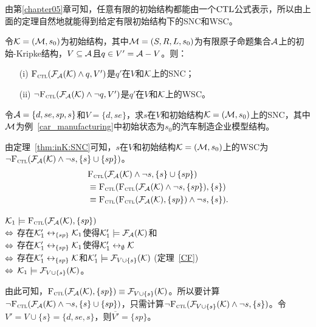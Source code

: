 由第\ref{chapter05}章可知，任意有限的初始结构都能由一个$\textrm{CTL}$公式表示，所以由上面的定理自然地就能得到给定有限初始结构下的SNC和WSC。
\begin{corollary}\label{thm:inK:SNC}
	令${\cal K}= ({\cal M}, s_0)$为初始结构，其中${\cal M}=(S,R,L,s_0)$为有限原子命题集合${\cal A}$上的初始-Kripke结构，$V \subseteq {\cal A}$且$q\in V' = {\cal A} - V$。则：
	\begin{itemize}
		\item[(i)] ${\textsc{F}_{\textsc{ctl}}}({\cal F}_{{\cal A}}({\cal K}) \wedge q, V')$是$q'$在$V$和${\cal K}$上的SNC；
		\item[(ii)] $\neg {\textsc{F}_{\textsc{ctl}}}({\cal F}_{{\cal A}}({\cal K}) \wedge \neg q, V')$是$q'$在$V$和${\cal K}$上的WSC。
	\end{itemize}
\end{corollary}

\begin{example}
令${\cal A}=\{d,se,sp,s\}$和$V=\{d,se\}$，求$s$在$V$和初始结构${\cal K} = ({\cal M},s_0)$上的SNC，其中${\cal M}$为例~\ref{car_manufacturing}中初始状态为$s_0$的汽车制造企业模型结构。

由定理~\ref{thm:inK:SNC}可知，$s$在$V$和初始结构${\cal K} = ({\cal M},s_0)$上的WSC为$\neg {\textsc{F}_{\textsc{ctl}}}({\cal F}_{{\cal A}}({\cal K}) \wedge \neg s, \{s\} \cup \{sp\})$。
\begin{align*}
&	{\textsc{F}_{\textsc{ctl}}}({\cal F}_{{\cal A}}({\cal K}) \wedge \neg s, \{s\} \cup \{sp\})\\
&	\equiv {\textsc{F}_{\textsc{ctl}}}({\textsc{F}_{\textsc{ctl}}}({\cal F}_{{\cal A}}({\cal K}) \wedge \neg s, \{sp\}), \{s\})\\
&	\equiv {\textsc{F}_{\textsc{ctl}}}({\textsc{F}_{\textsc{ctl}}}({\cal F}_{{\cal A}}({\cal K}), \{sp\})\wedge \neg s, \{s\}).
\end{align*}

${\cal K}_1 \models {\textsc{F}_{\textsc{ctl}}}({\cal F}_{{\cal A}}({\cal K}), \{sp\})$\\
$\Leftrightarrow$ 存在${\cal K}_1' \leftrightarrow_{\{sp\}} {\cal K}_1$使得${\cal K}_1' \models {\cal F}_{{\cal A}}({\cal K})$和\\
$\Leftrightarrow$ 存在${\cal K}_1' \leftrightarrow_{\{sp\}} {\cal K}_1$使得${\cal K}_1' \leftrightarrow_{\emptyset} {\cal K}$\\
$\Leftrightarrow$ 存在${\cal K}_1' \leftrightarrow_{\{sp\}} {\cal K}$和${\cal K}_1' \models {\cal F}_{V\cup \{s\}}({\cal K})$ \hfill (定理~\ref{CF})\\
$\Leftrightarrow$ ${\cal K}_1 \models {\cal F}_{V\cup \{s\}}({\cal K})$。

由此可知，$ {\textsc{F}_{\textsc{ctl}}}({\cal F}_{{\cal A}}({\cal K}), \{sp\}) \equiv {\cal F}_{V\cup \{s\}}({\cal K})$。所以要计算$\neg {\textsc{F}_{\textsc{ctl}}}({\cal F}_{{\cal A}}({\cal K}) \wedge \neg s, \{s\} \cup \{sp\})$，只需计算$\neg {\textsc{F}_{\textsc{ctl}}}({\cal F}_{V\cup \{s\}}({\cal K})\wedge \neg s, \{s\})$。令$V' = V \cup \{s\} = \{d,se,s\}$，则$\overline{V'} = \{sp\}$。



\end{example}
